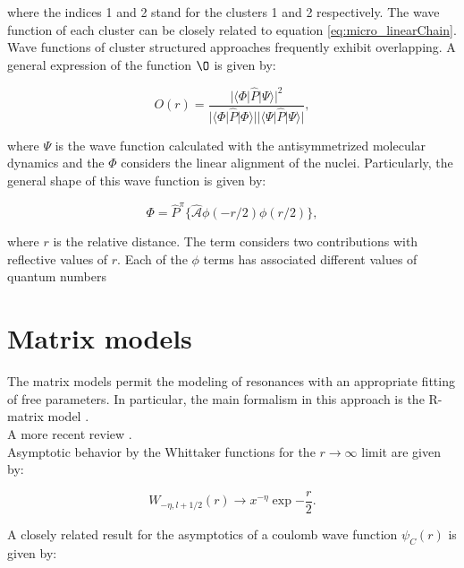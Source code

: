 \documentclass[openany]{book}
\begin{document}
where the indices 1 and 2 stand for the clusters 1 and 2 respectively. The wave function of each cluster can be closely related to equation \ref{eq:micro_linearChain}. \\

Wave functions of cluster structured approaches frequently exhibit overlapping. A general expression of the function $\O $ is given by:  

\begin{equation}\label{eq:micro_linearChain_overlapping}
	O(r) = \frac{|\langle \Phi | \hat P | \Psi \rangle |^2}{|\langle \Phi | \hat P | \Phi \rangle | |\langle \Psi | \hat P | \Psi \rangle |},
\end{equation} 

where $\Psi$ is the wave function calculated with the antisymmetrized molecular dynamics and the $\Phi$ considers the linear alignment of the nuclei. Particularly, the general shape of this wave function is given by: 

 \begin{equation}\label{eq:micro_linearChain_chainWaveFunction}
 	\Phi = \hat P^{\pi} \{ \hat {\mathcal{A}}  {\phi (-r/2)  \phi (r/2) } \},
 \end{equation} 

where $r$ is the relative distance. The term considers two contributions with reflective values of $r$. Each of the $\phi$ terms has associated different values of quantum numbers


\section{Matrix models}  \label{sec:matrixModels}

The matrix models permit the modeling of resonances with an appropriate fitting of free parameters. In particular, the main formalism in this approach is the R-matrix model \cite{lane_thomas_1958}. \\


A more recent review \cite{descouvemont_baye_2010}. \\

Asymptotic behavior by the Whittaker functions for the $r \rightarrow \infty$ limit are given by: 

\begin{equation}\label{rmatrix_whittaker_asymptotics}
	W_{-\eta, l + 1/2} (r) \rightarrow x^{-\eta} \exp {-\frac{r}{2}}.
\end{equation}

A closely related result for the asymptotics of a coulomb wave function $\psi_C(r)$ is given by:
\end{document}
